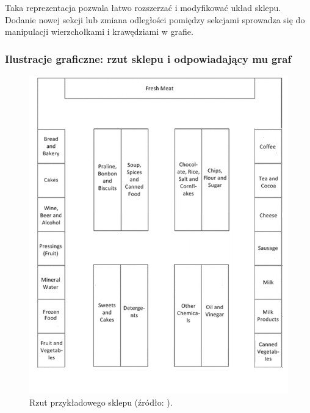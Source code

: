 Taka reprezentacja pozwala łatwo rozszerzać i modyfikować układ sklepu. Dodanie nowej sekcji lub zmiana odległości pomiędzy sekcjami sprowadza się do manipulacji wierzchołkami i krawędziami w grafie.

\subsubsection{Ilustracje graficzne: rzut sklepu i odpowiadający mu graf}

\begin{figure}[H]
\centering
\begin{minipage}{0.45\linewidth}
\centering
\includegraphics[width=\textwidth]{images/rzut_sklepu.png}
\caption{Rzut przykładowego sklepu (źródło: \cite{woeginger2016}).}
\label{fig:rzut_sklepu}
\end{minipage}
\hfill
\begin{minipage}{0.45\linewidth}
\centering

\end{minipage}
\end{figure}
